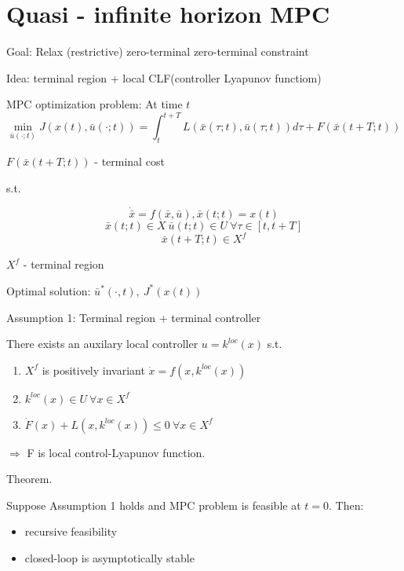 \chapter{Quasi - infinite horizon MPC}

Goal: Relax (restrictive) zero-terminal zero-terminal constraint

Idea: terminal region + local CLF(controller Lyapunov functiom)

MPC optimization problem: At time $t$
\begin{equation*}
\min_{\bar u(\cdot;t)} J(x(t),\bar u(\cdot;t)) = \int_t^{t+T}L(\bar x(\tau;t), \bar u(\tau;t))d\tau + F(\bar x(t+T;t)) 
\end{equation*}

$F(\bar x(t+T;t))$ - terminal cost

s.t.

\begin{equation*}
\dot{\bar x} = f(\bar x, \bar u), \bar x(t;t) = x(t)
\end{equation*}
\begin{equation*}
\bar x(t;t) \in X \ \bar u(t;t) \in U \ \forall \tau \in [t,t+T]
\end{equation*}
\begin{equation*}
\bar x(t+T;t) \in X^f
\end{equation*}

$X^f$ - terminal region

Optimal solution: $\bar u^*(\cdot, t), \ J^*(x(t))$

Assumption 1: Terminal region + terminal controller

There exists an auxilary local controller $u = k^{loc}(x)$ s.t.
\begin{enumerate}
\item $X^f$ is positively invariant $\dot x = f(x,k^{loc}(x))$
\item $k^{loc}(x) \in U \ \forall x \in X^f$
\item $\dot F(x) + L(x, k^{loc}(x)) \leq 0 \ \forall x \in X^f$
\end{enumerate}

$\Rightarrow$ F is local control-Lyapunov function.

Theorem.

Suppose Assumption 1 holds and MPC problem is feasible at $t=0$. Then:
\begin{itemize}
\item recursive feasibility
\item closed-loop is asymptotically stable
\end{itemize}

